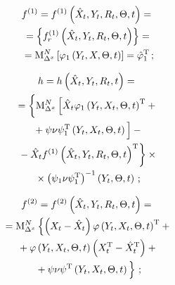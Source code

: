 \begin{multicols}{2}
\columnbreak

\noindent
\begin{multline}
f^{(1)}=f^{(1)}\left(\hat X_t, Y_t,R_t,\Theta, t\right)={}\\
{}=
\left\{ f_r^{(1)} \left( \hat X_t, Y_t, R_t,\Theta,  t\right)\right\}={}\\
{}=
\mathrm{M}_{\Delta^x}^N \left[  \varphi_1\left(Y_t,X,\Theta, t\right) \right]=
\hat{\varphi}_1^{\mathrm{T}}\,;
\end{multline}

    \vspace*{-14pt}

\noindent
\begin{multline}
h=h\left(\hat X_t, Y_t,R_t,t\right)={}\\
{}=
    \left\{
    \vphantom{\left(\hat X_t, Y_t,R_t,\Theta, t\right)^{\mathrm{T}}}
    \mm_{\Delta^x}^N \left[
     \hat X_t\varphi_1\left(Y_t,X_t,\Theta, t\right)^{\mathrm{T}} +{}
     \right.\right.\\
     \left. {}+ \psi\nu\psi_1^{\mathrm{T}} 
     \left(Y_t,X_t,\Theta, t\right)
     \vphantom{     \hat X_t\left(Y_t, Theta\right)^T}\right]-{}\\
\left.  {} -\hat X_t f^{(1)}\left(\hat X_t, Y_t,R_t,\Theta, t\right)^{\mathrm{T}}
\right\}\times{}\\
{}\times \left(\psi_1\nu\psi_1^{\mathrm{T}}\right)^{-1} \left(Y_t,\Theta, t\right)\,;
\end{multline}

\vspace*{-14pt}

\noindent
\begin{multline}
f^{(2)}=f^{(2)}\left(\hat X_t, Y_t,R_t,\Theta, t\right)={}\\
{}=\mathrm{M}_{\Delta^x}^N
    \left\{  \left(X_t-\hat X_t\right)\varphi\left(Y_t,X_t,\Theta, t\right)^{\mathrm{T}} + {}\right.\\
{}+ \varphi \left(Y_t,X_t,\Theta, t\right) 
\left(X_t^{\mathrm{T}}-\hat X_t^{\mathrm{T}}\right) +{}\\
\left.{}+\psi\nu\psi^{\mathrm{T}} \left(Y_t,X_t,\Theta, t\right)
     \vphantom{     \hat X_t\left(Y_t, Theta\right)^T}
\right\}\,;
\end{multline}

\vspace*{-14pt}


\end{multicols}

